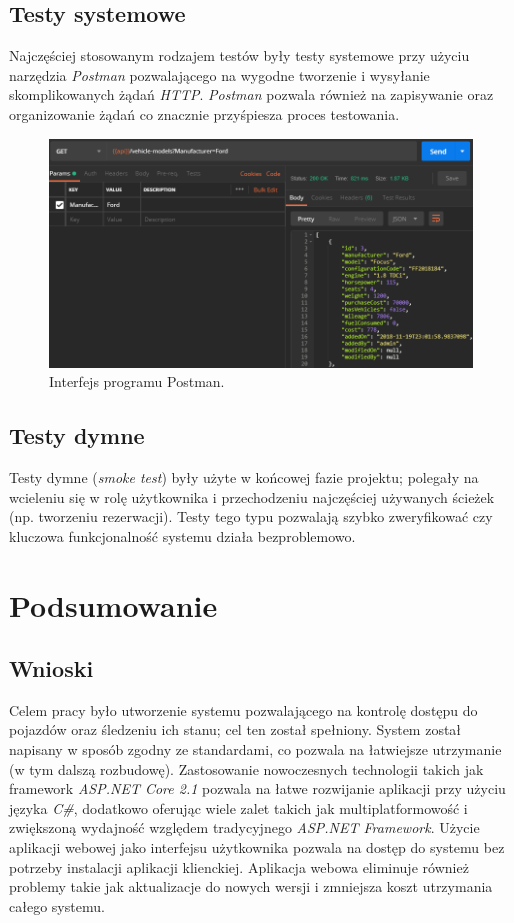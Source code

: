 \documentclass[eng,printmode,openany]{mgr}
\begin{document}
	\section{Testy systemowe}
	Najczęściej stosowanym rodzajem testów były testy systemowe przy użyciu narzędzia \textit{Postman} pozwalającego na wygodne tworzenie i wysyłanie skomplikowanych żądań \textit{HTTP}. \textit{Postman} pozwala również na zapisywanie oraz organizowanie żądań co znacznie przyśpiesza proces testowania.
	\begin{figure}[H]
		\centering
		\includegraphics[width=\textwidth]{images/tests_postman.png}
		\caption{Interfejs programu Postman.}
	\end{figure}
	\section{Testy dymne}
	Testy dymne (\textit{smoke test}) były użyte w końcowej fazie projektu; polegały na wcieleniu się w rolę użytkownika i przechodzeniu najczęściej używanych ścieżek (np. tworzeniu rezerwacji). Testy tego typu pozwalają szybko zweryfikować czy kluczowa funkcjonalność systemu działa bezproblemowo.
	
	\newpage
	\chapter{Podsumowanie}
	\section{Wnioski}
	Celem pracy było utworzenie systemu pozwalającego na kontrolę dostępu do pojazdów oraz śledzeniu ich stanu; cel ten został spełniony. System został napisany w sposób zgodny ze standardami, co pozwala na łatwiejsze utrzymanie (w tym dalszą rozbudowę). Zastosowanie nowoczesnych technologii takich jak framework \textit{ASP.NET Core 2.1} pozwala na łatwe rozwijanie aplikacji przy użyciu języka \textit{C\#}, dodatkowo oferując wiele zalet takich jak multiplatformowość i zwiększoną wydajność względem tradycyjnego \textit{ASP.NET Framework}. Użycie aplikacji webowej jako interfejsu użytkownika pozwala na dostęp do systemu bez potrzeby instalacji aplikacji klienckiej. Aplikacja webowa eliminuje również problemy takie jak aktualizacje do nowych wersji i zmniejsza koszt utrzymania całego systemu.
	
\end{document}
